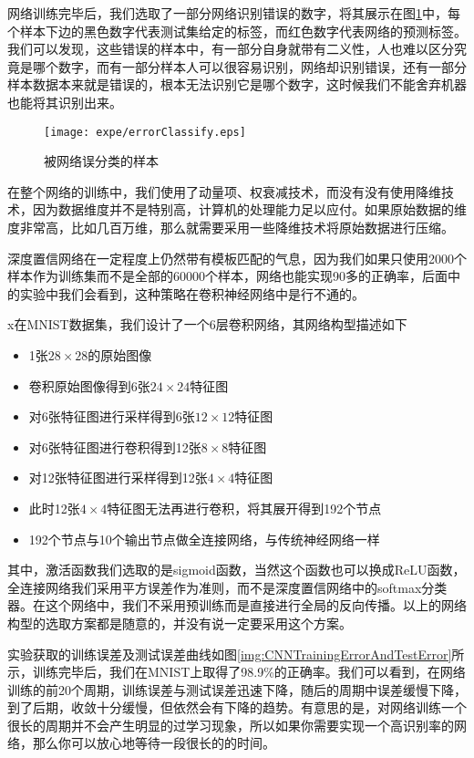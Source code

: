 网络训练完毕后，我们选取了一部分网络识别错误的数字，将其展示在图\ref{img:errorClassify}中，每个样本下边的黑色数字代表测试集给定的标签，而红色数字代表网络的预测标签。我们可以发现，这些错误的样本中，有一部分自身就带有二义性，人也难以区分究竟是哪个数字，而有一部分样本人可以很容易识别，网络却识别错误，还有一部分样本数据本来就是错误的，根本无法识别它是哪个数字，这时候我们不能舍弃机器也能将其识别出来。

\begin{figure}[!htbp]
\centering
\texttt{[image: expe/errorClassify.eps]}
\caption{被网络误分类的样本}
\label{img:errorClassify}
\end{figure}

在整个网络的训练中，我们使用了动量项、权衰减技术，而没有没有使用降维技术，因为数据维度并不是特别高，计算机的处理能力足以应付。如果原始数据的维度非常高，比如几百万维，那么就需要采用一些降维技术将原始数据进行压缩。

深度置信网络在一定程度上仍然带有模板匹配的气息，因为我们如果只使用2000个样本作为训练集而不是全部的60000个样本，网络也能实现90多的正确率，后面中的实验中我们会看到，这种策略在卷积神经网络中是行不通的。


x在MNIST数据集，我们设计了一个6层卷积网络，其网络构型描述如下
\begin{itemize}
\item 1张$28\times 28$的原始图像
\item 卷积原始图像得到6张$24\times 24$特征图
\item 对6张特征图进行采样得到6张$12\times 12$特征图
\item 对6张特征图进行卷积得到12张$8\times 8$特征图
\item 对12张特征图进行采样得到12张$4\times 4$特征图
\item 此时12张$4\times 4$特征图无法再进行卷积，将其展开得到192个节点
\item 192个节点与10个输出节点做全连接网络，与传统神经网络一样
\end{itemize}

其中，激活函数我们选取的是sigmoid函数，当然这个函数也可以换成ReLU函数，全连接网络我们采用平方误差作为准则，而不是深度置信网络中的softmax分类器。在这个网络中，我们不采用预训练而是直接进行全局的反向传播。以上的网络构型的选取方案都是随意的，并没有说一定要采用这个方案。

实验获取的训练误差及测试误差曲线如图\ref{img:CNNTrainingErrorAndTestError}所示，训练完毕后，我们在MNIST上取得了98.9\%的正确率。我们可以看到，在网络训练的前20个周期，训练误差与测试误差迅速下降，随后的周期中误差缓慢下降，到了后期，收敛十分缓慢，但依然会有下降的趋势。有意思的是，对网络训练一个很长的周期并不会产生明显的过学习现象，所以如果你需要实现一个高识别率的网络，那么你可以放心地等待一段很长的的时间。

